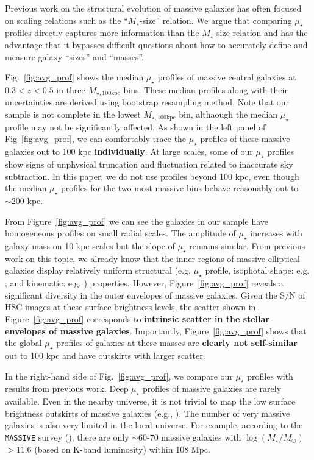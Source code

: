 \documentclass[a4paper,fleqn,usenatbib]{mnras}
\def\mstar{{$M_{\star}$}}
\def\logms{{$\log (M_{\star}/M_{\odot})$}}
\def\mtot{{$M_{\star,100\mathrm{kpc}}$}}
\def\s2n{{$\mathrm{S}/\mathrm{N}$}}
\def\mden{{$\mu_{\star}$}}
\begin{document}
    Previous work on the structural evolution of massive galaxies has often focused on 
    scaling relations such as the ``\mstar{}-size'' relation.  
    We argue that  comparing \mden{} profiles directly captures more information than
    the \mstar{}-size relation and has the advantage that it bypasses difficult 
    questions about how to accurately define and measure galaxy ``sizes'' and 
    ``masses''.
    
    Fig.~\ref{fig:avg_prof} shows the median \mden{} profiles of massive central 
    galaxies at $0.3 < z < 0.5$ in three \mtot{} bins.
    These median profiles along with their uncertainties are derived using bootstrap
    resampling method. 
    Note that our sample is not complete in the lowest \mtot{} bin, althaough the 
    median \mden{} profile may not be significantly affected. 
    As shown in the left panel of Fig~\ref{fig:avg_prof}, we can comfortably trace
    the \mden{} profiles of these massive galaxies out to 100 kpc \textbf{individually}.  
    At large scales, some of our \mden{} profiles show signs of unphysical truncation and
    fluctuation related to inaccurate sky subtraction. 
    In this paper, we do not use profiles beyond 100 kpc, even though the median 
    \mden{} profiles for the two most massive bins behave reasonably out to 
    ${\sim} 200$ kpc. 
       
    From Figure~\ref{fig:avg_prof} we can see the galaxies in our sample have 
    homogeneous profiles on small radial scales. 
    The amplitude of \mden{} increases with galaxy mass on 10 kpc scales but the slope 
    of \mden{} remains similar.  
    From previous work on this topic, we already know that the inner regions of 
    massive elliptical galaxies display relatively uniform structural (e.g.
    \mden{} profile, isophotal shape: e.g. \citealt{Lauer07, Kormendy2009, 
    Schombert2015}; and kinematic: e.g. \citealt{Cappellari13b}) properties.  
    However, Figure~\ref{fig:avg_prof} reveals a significant diversity in the outer 
    envelopes of massive galaxies.  
    Given the \s2n{} of HSC images at these surface brightness levels, the scatter 
    shown in Figure~\ref{fig:avg_prof} corresponds to \textbf{intrinsic scatter in 
    the stellar envelopes of massive galaxies}. 
    Importantly, Figure~\ref{fig:avg_prof} shows that the global \mden{} profiles 
    of galaxies at these masses are \textbf{clearly not self-similar} out to 100 
    kpc and have outskirts with larger scatter. 
     
    In the right-hand side of Fig.~\ref{fig:avg_prof}, we compare our \mden{} 
    profiles with results from previous work. 
    Deep \mden{} profiles of massive galaxies are rarely available. 
    Even in the nearby universe, it is not trivial to map the low surface
    brightness outskirts of massive galaxies (e.g., 
    \citealt{Capaccioli2015, Iodice2016, Iodice2017, Spavone2017, Mihos2017}). 
    The number of very massive galaxies is also very limited in the local universe.
    For example, according to the \texttt{MASSIVE} survey (\citealt{Ma2014}), there
    are only $\sim 60$-70 massive galaxies with \logms$> 11.6$ (based on K-band 
    luminosity) within 108 Mpc.
       
\end{document}
